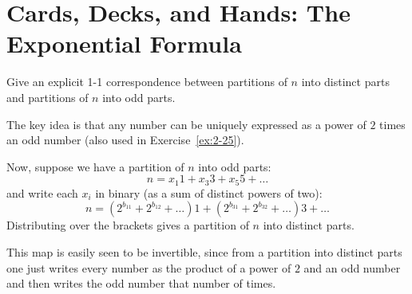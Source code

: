 

\section{Cards, Decks, and Hands: The Exponential Formula}
\begin{exercise}
    Give an explicit 1-1 correspondence between partitions of $n$ into distinct parts and partitions of $n$ into odd parts.
\end{exercise}
\begin{solution}
    The key idea is that any number can be uniquely expressed as a power of $2$ times an odd number (also used in Exercise~\ref{ex:2-25}).

    Now, suppose we have a partition of $n$ into odd parts:
    \[
        n = x_1 1+ x_3 3 + x_5 5 + \ldots
    \]
    and write each $x_i$ in binary (as a sum of distinct powers of two):
    \[
        n = (2^{b_{11}} + 2^{b_{12}} + \ldots)1 + (2^{b_{31}} + 2^{b_{32}} + \ldots)3 + \ldots
    \]
    Distributing over the brackets gives a partition of $n$ into distinct parts.

    This map is easily seen to be invertible, since from a partition into distinct parts one just writes every number as the product of a power of $2$ and an odd number and then writes the odd number that number of times.
\end{solution}


